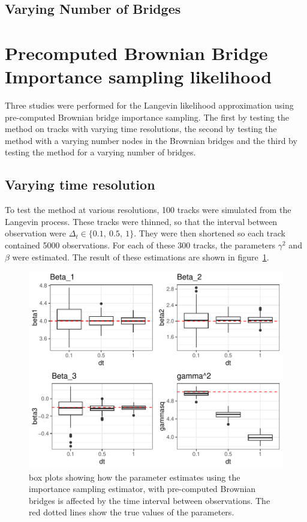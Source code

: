 \subsection{Varying Number of Bridges}

\section{Precomputed Brownian Bridge Importance sampling likelihood}
Three studies were performed for the Langevin likelihood approximation using pre-computed Brownian bridge importance sampling. The first by testing the method on tracks with varying time resolutions, the second by testing the method with a varying number nodes in the Brownian bridges and the third by testing the method for a varying number of bridges.

\subsection{Varying time resolution}
To test the method at various resolutions, 100 tracks were simulated from the Langevin process. These tracks were thinned, so that the interval between observation were $\Delta_t \in \{0.1, \ 0.5, \ 1\}$. They were then shortened so each track contained 5000 observations. For each of these 300 tracks, the parameters $\gamma^2$ and $\beta$ were estimated. The result of these estimations are shown in figure~\ref{fig:varying thin boxplot precomputed BB}.

\begin{figure}[H]
    \centering
    \includegraphics[width=\linewidth]{Images/Results/varying dt estimates precomputed BB.pdf}
    \caption[Box plots of Parameter Estimates for various observation intervals]{box plots showing how the parameter estimates using the importance sampling estimator, with pre-computed Brownian bridges is affected by the time interval between observations. The red dotted lines show the true values of the parameters.}
    \label{fig:varying thin boxplot precomputed BB}
\end{figure}

